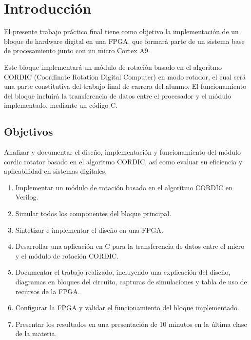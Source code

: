\documentclass[12pt,a4paper, twoside]{article} %
\begin{document}
\maketitle
\tableofcontents

\newpage

\section{Introducción}
\label{sec:org60390fa}

El presente trabajo práctico final tiene como objetivo la implementación de un bloque de hardware digital en una FPGA, que formará parte de un sistema base de procesamiento junto con un micro Cortex A9.

Este bloque implementará un módulo de rotación basado en el algoritmo CORDIC (Coordinate Rotation Digital Computer) en modo rotador, el cual será una parte constitutiva del trabajo final de carrera del alumno. El funcionamiento del bloque incluirá la transferencia de datos entre el procesador y el módulo implementado, mediante un código C.


\subsection{Objetivos}
\label{subsec:org12e44a2}

Analizar y documentar el diseño, implementación y funcionamiento del módulo cordic rotator basado en el algoritmo CORDIC, así como evaluar su eficiencia y aplicabilidad en sistemas digitales.

\begin{enumerate}
    \item Implementar un módulo de rotación basado en el algoritmo CORDIC en Verilog.
    \item Simular todos los componentes del bloque principal.
    \item Sintetizar e implementar el diseño en una FPGA.
    \item Desarrollar una aplicación en C para la transferencia de datos entre el micro y el módulo de rotación CORDIC.
    \item Documentar el trabajo realizado, incluyendo una explicación del diseño, diagramas en bloques del circuito, capturas de simulaciones y tabla de uso de recursos de la FPGA.
    \item Configurar la FPGA y validar el funcionamiento del bloque implementado.
    \item Presentar los resultados en una presentación de 10 minutos en la última clase de la materia.
\end{enumerate}
\end{document}
